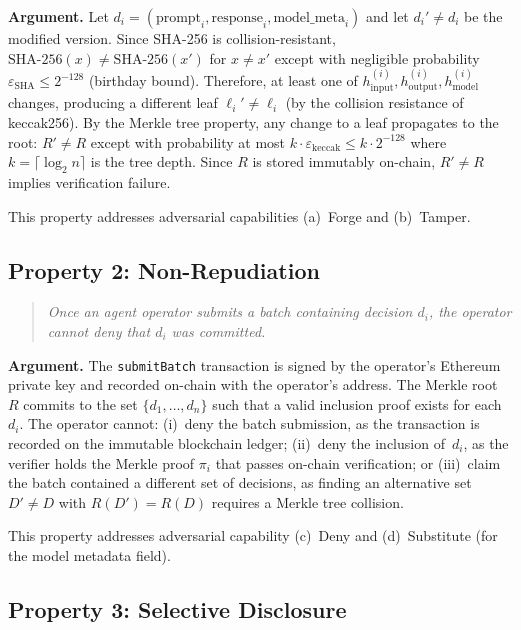 \documentclass[manuscript,nonacm]{acmart}
\begin{document}
\textbf{Argument.}
Let $d_i = (\text{prompt}_i, \text{response}_i, \text{model\_meta}_i)$ and let $d_i' \neq d_i$ be the modified version.
Since SHA-256 is collision-resistant, $\text{SHA-256}(x) \neq \text{SHA-256}(x')$ for $x \neq x'$ except with negligible probability $\varepsilon_{\text{SHA}} \leq 2^{-128}$ (birthday bound).
Therefore, at least one of $h_{\text{input}}^{(i)}, h_{\text{output}}^{(i)}, h_{\text{model}}^{(i)}$ changes, producing a different leaf $\ell_i' \neq \ell_i$ (by the collision resistance of keccak256).
By the Merkle tree property, any change to a leaf propagates to the root: $R' \neq R$ except with probability at most $k \cdot \varepsilon_{\text{keccak}} \leq k \cdot 2^{-128}$ where $k = \lceil \log_2 n \rceil$ is the tree depth.
Since $R$ is stored immutably on-chain, $R' \neq R$ implies verification failure.

This property addresses adversarial capabilities (a)~Forge and (b)~Tamper.

\subsection{Property 2: Non-Repudiation}

\begin{quote}
\emph{Once an agent operator submits a batch containing decision $d_i$, the operator cannot deny that $d_i$ was committed.}
\end{quote}

\textbf{Argument.}
The \texttt{submitBatch} transaction is signed by the operator's Ethereum private key and recorded on-chain with the operator's address.
The Merkle root~$R$ commits to the set $\{d_1, \ldots, d_n\}$ such that a valid inclusion proof exists for each~$d_i$.
The operator cannot: (i)~deny the batch submission, as the transaction is recorded on the immutable blockchain ledger; (ii)~deny the inclusion of~$d_i$, as the verifier holds the Merkle proof $\pi_i$ that passes on-chain verification; or (iii)~claim the batch contained a different set of decisions, as finding an alternative set $D' \neq D$ with $R(D') = R(D)$ requires a Merkle tree collision.

This property addresses adversarial capability (c)~Deny and (d)~Substitute (for the model metadata field).

\subsection{Property 3: Selective Disclosure}
\end{document}
